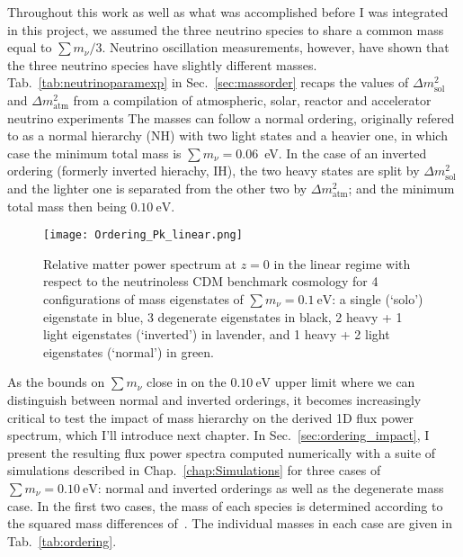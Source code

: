Throughout this work as well as what was accomplished before I was integrated in this project, we assumed the three neutrino species to share a common mass equal to $\sum m_\nu / 3$. Neutrino oscillation measurements, however, have shown that the three neutrino species have slightly different masses. 
Tab.~\ref{tab:neutrinoparamexp} in Sec.~\ref{sec:massorder} recaps the values of $\Delta m^2_{\mathrm{sol}}$ and $\Delta m^2_{\mathrm{atm}}$ from a compilation of atmospheric, solar, reactor and accelerator neutrino experiments
The masses can follow a normal ordering, originally refered to as a normal hierarchy (NH) with two light states and a heavier one, in which case the minimum total mass is $\sum m_\nu=0.06$~eV. In the case of an inverted ordering (formerly inverted hierachy, IH), the two heavy states are split by $\Delta m^2_{\mathrm{sol}}$  and the lighter one is separated from the other two by $\Delta m^2_{\mathrm{atm}}$; and the minimum total mass then being $0.10~\mathrm{eV}$. \\

\begin{figure}
\begin{center}
\texttt{[image: Ordering\_Pk\_linear.png]}
\caption{Relative matter power spectrum at $z=0$ in the linear regime with respect to the neutrinoless CDM benchmark cosmology for 4 configurations of mass eigenstates of $\sum m_\nu = 0.1~\mathrm{eV}$: a single (`solo') eigenstate in blue, 3 degenerate eigenstates in black, 2 heavy + 1 light eigenstates (`inverted') in lavender, and 1 heavy + 2 light eigenstates (`normal') in green. }
\label{fig:pk_hierarchy}
\end{center}
\end{figure}

As the bounds on $\sum m_\nu$ close in on the $0.10~\mathrm{eV}$ upper limit where we can distinguish between normal and inverted orderings, it becomes increasingly critical to test the impact of mass hierarchy on the derived 1D flux power spectrum, which I'll introduce next chapter. In Sec.~\ref{sec:ordering_impact}, I present the resulting flux power spectra computed numerically with a suite of simulations described in Chap.~\ref{chap:Simulations} for three cases of $\sum m_\nu = 0.10~\mathrm{eV}$: normal and inverted orderings as well as the degenerate mass case. In the first two cases, the mass of each species is determined according to the squared mass differences of~\cite{Capozzi2013csa}. The individual masses in each case are given in Tab.~\ref{tab:ordering}. \\

